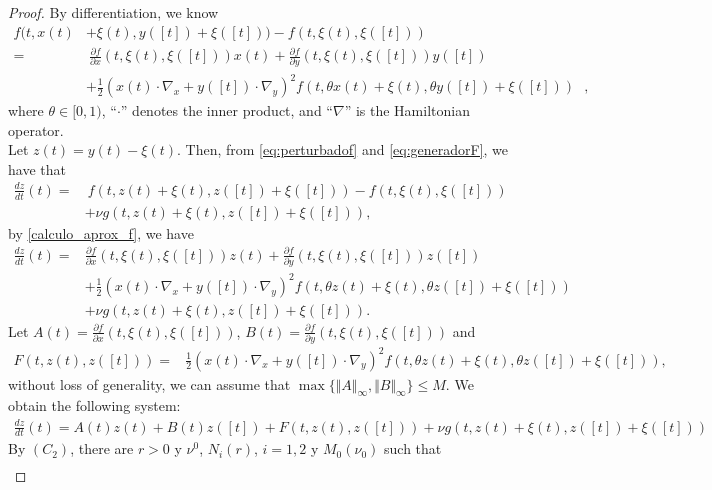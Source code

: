 \documentclass[10pt,a4paper]{amsart}
\begin{document}
\begin{proof}
By differentiation, we know
\begin{equation}\label{calculo_aprox_f}
\begin{aligned}
f(t,x(t) &+\xi(t),y([t])+\xi([t]))-f(t,\xi(t),\xi([t])) 
\\
=&~{}\frac{\partial f}{\partial x}(t,\xi(t),\xi([t]))x(t) 
+\frac{\partial f}{\partial y}(t,\xi(t),\xi([t]))y([t]) \\
&+\frac{1}{2}(x(t)\cdot \nabla_{x}+y([t])\cdot \nabla_{y})^{2}f(t,\theta x(t)+\xi(t),\theta y([t])+\xi([t])) \ \ \ 
,
\end{aligned}
\end{equation}
where $\theta \in [0, 1)$, ``$\cdot$'' denotes the inner product, and ``$\nabla$'' is the Hamiltonian operator. \\  
Let $z(t) = y(t) - \xi(t)$. Then, from \eqref{eq:perturbadof} and \eqref{eq:generadorF}, we have that
\[
\begin{aligned}
\frac{dz}{dt}(t)=&~{}f(t,z(t)+\xi(t),z([t])+\xi([t]))-f(t,\xi(t),\xi([t]))\\
 & +\nu g\left(t,z(t)+\xi(t),z([t])+\xi([t])\right),
\end{aligned}
\]
by \eqref{calculo_aprox_f}, we have
\[
\begin{aligned}
\frac{dz}{dt}(t)=&\frac{\partial f}{\partial x}(t,\xi(t),\xi([t]))z(t)+\frac{\partial f}{\partial y}(t,\xi(t),\xi([t]))z([t])\\
 &+\frac{1}{2}(x(t)\cdot \nabla_{x}+y([t])\cdot \nabla_{y})^{2}f(t,\theta z(t)+\xi(t),\theta z([t])+\xi([t]))\\
 &+\nu g\left(t,z(t)+\xi(t),z([t])+\xi([t])\right).
\end{aligned}
\]
Let $A(t)=\frac{\partial f}{\partial x}(t,\xi(t),\xi([t])) $, $B(t)=\frac{\partial f}{\partial y}(t,\xi(t),\xi([t]))$ and 
\[
\begin{aligned}
F(t,z(t),z([t]))=&\frac{1}{2}(x(t)\cdot \nabla_{x}+y([t])\cdot \nabla_{y})^{2}f(t,\theta z(t)+\xi(t),\theta z([t])+\xi([t])),
\end{aligned}
\]
without loss of generality, we can assume that  
$\max \{ \Vert A \Vert_{\infty}, \Vert B \Vert_{\infty} \} \leq M$.  
We obtain the following system:
\[
\begin{aligned}
\frac{dz}{dt}(t)=A(t)z(t)+B(t)z([t])+F(t,z(t),z([t]))+\nu g\left(t,z(t)+\xi(t),z([t])+\xi([t])\right)
\end{aligned}
\]
By $(C_2)$, there are $r>0$ y $\nu^{0}$, $N_i(r)$, $i=1,2$ y $M_0(\nu_{0})$ such that
\[
\begin{aligned}

\end{aligned}\]
\end{proof}
\end{document}
